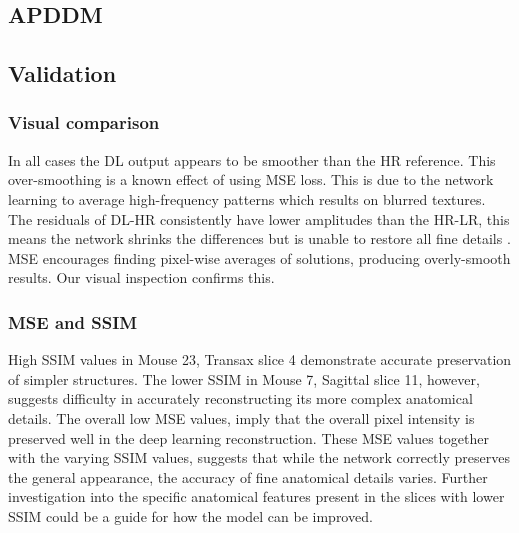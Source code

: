 \documentclass[twocolumn]{article}
\begin{document}
\subsection{APDDM}

\subsection{Validation}

\subsubsection{Visual comparison}
In all cases the DL output appears to be smoother than the HR reference. This over-smoothing is a known effect of using MSE loss. 
This is due to the network learning to average high-frequency patterns which results on blurred textures. 
The residuals of DL-HR consistently have lower amplitudes than the HR-LR, this means the network shrinks the differences but is unable to restore all fine details \cite{MSE}. 
MSE encourages finding pixel-wise averages of solutions, producing overly-smooth results. Our visual inspection confirms this.

\subsubsection{MSE and SSIM}
High SSIM values in Mouse 23, Transax slice 4 demonstrate accurate preservation of simpler structures. The lower SSIM in Mouse 7, Sagittal slice 11, however, suggests difficulty in accurately reconstructing its more complex anatomical details. The overall low MSE values, imply that the overall pixel intensity is preserved well in the deep learning reconstruction.  
These MSE values together with the varying SSIM values, suggests that while the network correctly preserves the general appearance, the accuracy of fine anatomical details varies. Further investigation into the specific anatomical features present in the slices with lower SSIM could be a guide for how the model can be improved.
\end{document}

